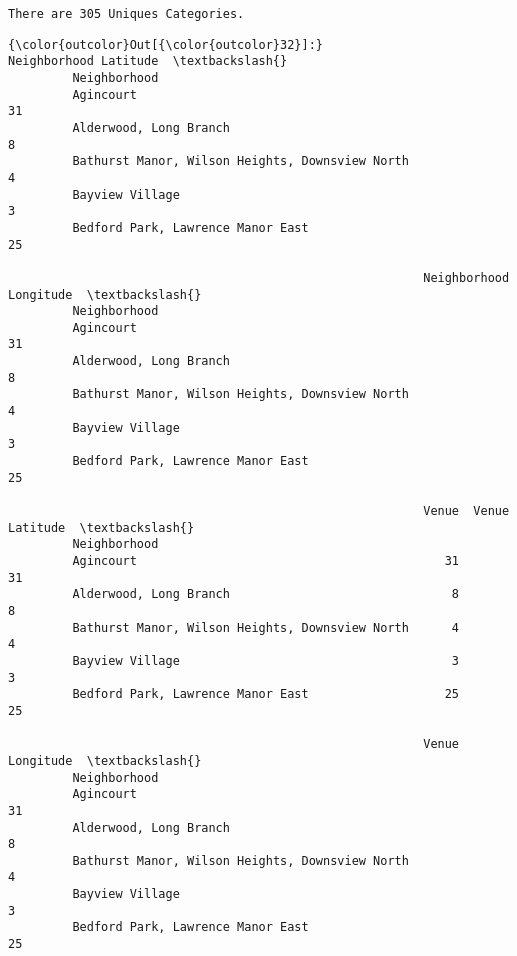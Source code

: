 \documentclass[11pt]{article}
\begin{document}
    \begin{Verbatim}[commandchars=\\\{\}]
There are 305 Uniques Categories.

    \end{Verbatim}

\begin{Verbatim}[commandchars=\\\{\}]
{\color{outcolor}Out[{\color{outcolor}32}]:}                                                  Neighborhood Latitude  \textbackslash{}
         Neighborhood                                                             
         Agincourt                                                           31   
         Alderwood, Long Branch                                               8   
         Bathurst Manor, Wilson Heights, Downsview North                      4   
         Bayview Village                                                      3   
         Bedford Park, Lawrence Manor East                                   25   
         
                                                          Neighborhood Longitude  \textbackslash{}
         Neighborhood                                                              
         Agincourt                                                            31   
         Alderwood, Long Branch                                                8   
         Bathurst Manor, Wilson Heights, Downsview North                       4   
         Bayview Village                                                       3   
         Bedford Park, Lawrence Manor East                                    25   
         
                                                          Venue  Venue Latitude  \textbackslash{}
         Neighborhood                                                             
         Agincourt                                           31              31   
         Alderwood, Long Branch                               8               8   
         Bathurst Manor, Wilson Heights, Downsview North      4               4   
         Bayview Village                                      3               3   
         Bedford Park, Lawrence Manor East                   25              25   
         
                                                          Venue Longitude  \textbackslash{}
         Neighborhood                                                       
         Agincourt                                                     31   
         Alderwood, Long Branch                                         8   
         Bathurst Manor, Wilson Heights, Downsview North                4   
         Bayview Village                                                3   
         Bedford Park, Lawrence Manor East                             25   
         

\end{Verbatim}
\end{document}
